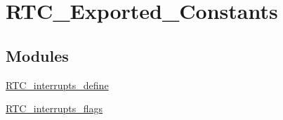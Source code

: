 \hypertarget{group__RTC__Exported__Constants}{
\section{RTC\_\-Exported\_\-Constants}
\label{group__RTC__Exported__Constants}
}
\subsection*{Modules}
\begin{DoxyCompactItemize}
\item 
\hyperlink{group__RTC__interrupts__define}{RTC\_\-interrupts\_\-define}
\item 
\hyperlink{group__RTC__interrupts__flags}{RTC\_\-interrupts\_\-flags}
\end{DoxyCompactItemize}
